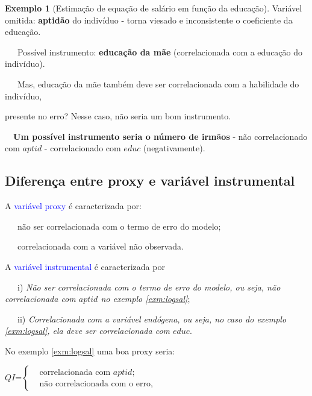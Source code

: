 \documentclass[
]{book}
\theoremstyle{definition}
\theoremstyle{definition}
\newtheorem{example}{Exemplo}[chapter]
\theoremstyle{definition}
\theoremstyle{remark}
\begin{document}
\begin{example}[Estimação de equação de salário em função da educação]
\protect\hypertarget{exm:logsal}{}{\label{exm:logsal} {} }\textbar{} Variável omitida: \textbf{aptidão} do indivíduo - torna viesado e inconsistente o coeficiente da educação.

~~~Possível instrumento: \textbf{educação da mãe} (correlacionada com a educação do indivíduo).

~~~Mas, educação da mãe também deve ser correlacionada com a habilidade do indivíduo,

presente no erro? Nesse caso, não seria um bom instrumento.

~~\textbf{Um possível instrumento seria o número de irmãos} - não correlacionado com \(aptid\) - correlacionado com \(educ\) (negativamente).
\end{example}

\hypertarget{diferenuxe7a-entre-proxy-e-variuxe1vel-instrumental}{%
\subsection{Diferença entre proxy e variável instrumental}\label{diferenuxe7a-entre-proxy-e-variuxe1vel-instrumental}}

A \textcolor{blue}{ variável proxy } é caracterizada por:

~~~não ser correlacionada com o termo de erro do modelo;

~~~correlacionada com a variável não observada.

A \textcolor{blue}{ variável instrumental } é caracterizada por

~~~i) \emph{Não ser correlacionada com o termo de erro do modelo, ou seja, não correlacionada com \(aptid\) no exemplo \ref{exm:logsal}};

~~~ii) \emph{Correlacionada com a variável endógena, ou seja, no caso do exemplo \ref{exm:logsal}, ela deve ser correlacionada com \(educ\)}.

No exemplo \ref{exm:logsal} uma boa proxy seria:

\begin{center}
$QI$=$\begin{cases} &\mbox{correlacionada com $aptid$};\\
    &\mbox{não correlacionada  com o erro},
   \end{cases}$
\end{center}
\end{document}
